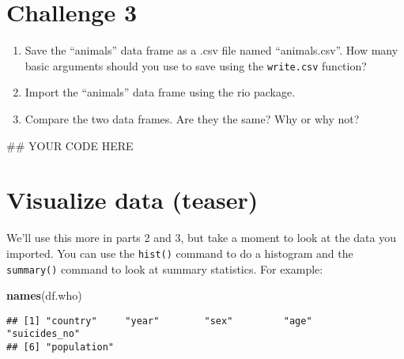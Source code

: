 \documentclass[]{article}
\newenvironment{Shaded}{\begin{snugshade}}{\end{snugshade}}
\newcommand{\KeywordTok}[1]{\textcolor[rgb]{0.13,0.29,0.53}{\textbf{#1}}}
\newcommand{\OperatorTok}[1]{\textcolor[rgb]{0.81,0.36,0.00}{\textbf{#1}}}
\newcommand{\NormalTok}[1]{#1}
\providecommand{\tightlist}{%
  \setlength{\itemsep}{0pt}\setlength{\parskip}{0pt}}
\begin{document}
\section{\texorpdfstring{\textbf{Challenge
3}}{Challenge 3}}\label{challenge-3}

\begin{enumerate}
\def\labelenumi{\arabic{enumi}.}
\tightlist
\item
  Save the ``animals'' data frame as a .csv file named ``animals.csv''.
  How many basic arguments should you use to save using the
  \texttt{write.csv} function?
\item
  Import the ``animals'' data frame using the rio package.
\item
  Compare the two data frames. Are they the same? Why or why not?
\end{enumerate}

\begin{Shaded}
\begin{Highlighting}[]
\NormalTok{## YOUR CODE HERE}
\end{Highlighting}
\end{Shaded}

\section{Visualize data (teaser)}\label{visualize-data-teaser}

We'll use this more in parts 2 and 3, but take a moment to look at the
data you imported. You can use the \texttt{hist()} command to do a
histogram and the \texttt{summary()} command to look at summary
statistics. For example:

\begin{Shaded}
\begin{Highlighting}[]
\KeywordTok{names}\NormalTok{(df.who)}
\end{Highlighting}
\end{Shaded}

\begin{verbatim}
## [1] "country"     "year"        "sex"         "age"         "suicides_no"
## [6] "population"
\end{verbatim}

\begin{Shaded}
\end{Shaded}
\end{document}
